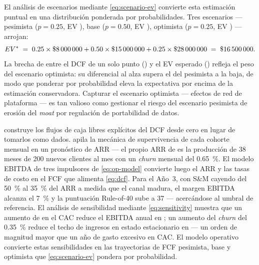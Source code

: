 El análisis de escenarios mediante \cref{eq:scenario-ev} convierte esta estimación puntual en
una distribución ponderada por probabilidades. Tres escenarios --- pesimista (\(p=0.25\), EV
), base (\(p=0.50\), EV ), optimista (\(p=0.25\), EV
) --- arrojan:
\[
  EV^* \;=\; 0.25\times\$\num{8000000}
           + 0.50\times\$\num{15000000}
           + 0.25\times\$\num{28000000}
         \;=\; \$\num{16500000}.
\]
La brecha de  entre el DCF de un solo punto () y el EV esperado
() refleja el peso del escenario optimista: su diferencial al alza supera el del
pesimista a la baja, de modo que ponderar por probabilidad eleva la expectativa por encima de la
estimación conservadora. Capturar el escenario optimista --- efectos de red de plataforma ---
es tan valioso como gestionar el riesgo del escenario pesimista de erosión del \emph{moat} por
regulación de portabilidad de datos.

 construye los flujos de caja libres explícitos del DCF desde cero en
lugar de tomarlos como dados.  apila la mecánica de supervivencia de
cada cohorte mensual en un pronóstico de ARR --- el propio ARR de  es la
producción de 38 meses de \num{200} nuevos clientes al mes con un \emph{churn} mensual del
\qty{0.65}{\percent}. El modelo EBITDA de tres impulsores de \cref{eq:op-model} convierte luego
el ARR y las tasas de costo en el FCF que alimenta \cref{eq:dcf}. Para el Año~3, con S\&M
cayendo del \qty{50}{\percent} al \qty{35}{\percent} del ARR a medida que el canal madura, el
margen EBITDA alcanza el \qty{+7}{\percent} y la puntuación Rule-of-40 sube a 37 ---
acercándose al umbral de referencia. El análisis de sensibilidad mediante \cref{eq:sensitivity}
muestra que un aumento de  en el CAC reduce el EBITDA anual en ;
un aumento del \emph{churn} del \qty{0.35}{\percent} reduce el techo de ingresos en estado
estacionario en  --- un orden de magnitud mayor que un año de gasto excesivo en
CAC. El modelo operativo convierte estas sensibilidades en las trayectorias de FCF pesimista,
base y optimista que \cref{eq:scenario-ev} pondera por probabilidad.

